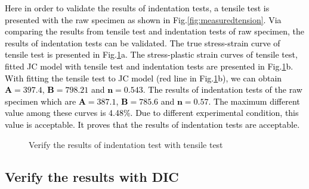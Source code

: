 \documentclass[review]{elsarticle}
\begin{document}
\textcolor{black}{
Here in order to validate the results of indentation tests, a tensile test is presented with the raw specimen as shown in Fig.\ref{fig:measuredtension}. Via comparing the results from tensile test and indentation tests of raw specimen, the results of indentation tests can be validated. The true stress-strain curve of tensile test is presented in Fig.\ref{fig:tensile}a. The stress-plastic strain curves of tensile test, fitted JC model with tensile test and indentation tests are presented in Fig.\ref{fig:tensile}b. With fitting the tensile test to JC model (red line in Fig.\ref{fig:tensile}b), we can obtain $\mathbf{A} = 397.4$, $\mathbf{B}=798.21$ and $\mathbf{n}=0.543$. The results of indentation tests of the raw specimen which are $\mathbf{A} = 387.1$, $\mathbf{B}=785.6$ and $\mathbf{n}=0.57$. The maximum different value among these curves is 4.48\%. Due to different experimental condition, this value is acceptable. It proves that the results of indentation tests are acceptable.
}

\begin{figure}[h]
\centering
{}

\caption{Verify the results of indentation test with tensile test}
\label{fig:tensile}
\end{figure}

\subsection{Verify the results with DIC}
\end{document}
